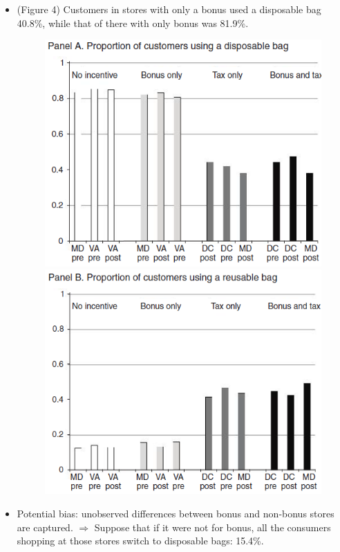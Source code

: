 \documentclass[../root]{subfiles}
\begin{document}
    \begin{itemize}
      \item (Figure 4) Customers in stores with only a bonus used a disposable bag 40.8\%, while that of there with only bonus was 81.9\%.
      \begin{figure}[ht]
        \centering
        \includegraphics[scale = .8]{0807tanji/F4A}
        \includegraphics[scale = .8]{0807tanji/F4B}
      \end{figure}
      \item Potential bias: unobserved differences between bonus and non-bonus stores are captured.
      $\Rightarrow$ Suppose that if it were not for bonus, all the consumers shopping at those stores switch to disposable bags: 15.4\%.
    \end{itemize}
\end{document}
